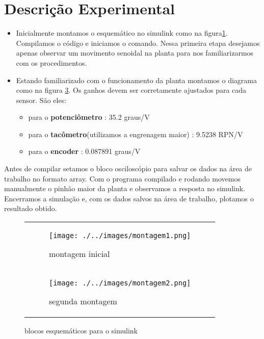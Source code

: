 \documentclass[a4paper,11pt]{article}
\begin{document}
\section{Descrição Experimental}
\begin{itemize}
\item Inicialmente montamos o esquemático no simulink como na figura\ref{fig:montagem1}. Compilamos
o código e iniciamos o comando. Nessa primeira etapa desejamos apenas observar um movimento 
senoidal na planta para nos familiarizarmos com os procedimentos.

\item Estando familiarizado com o funcionamento da planta montamos o diagrama como na figura
\ref{fig:montagem2}. Os ganhos devem ser corretamente ajustados para cada sensor. São eles:
	\begin{itemize}
		\item para o \textbf{potenciômetro} : 35.2 graus/V
		\item para o \textbf{tacômetro}(utilizamos a engrenagem maior) : 9.5238 RPN/V
		\item para o \textbf{encoder }: 0.087891 graus/V
	\end{itemize}
\end{itemize}
Antes de compilar setamos o bloco osciloscópio para salvar os dados na área de trabalho no formato
array. Com o programa compilado e rodando movemos manualmente o pinhão maior da planta e 
observamos a resposta no simulink. Encerramos a simulação e, com os dados salvos na área de 
trabalho, plotamos o resultado obtido.
\FloatBarrier
\begin{figure}[!htp]
\centering
	\begin{tabular}{l}
		\begin{subfigure}[!htp]{0.5\textwidth}
			\centering
			\texttt{[image: ./../images/montagem1.png]}
			\caption{montagem inicial}
			\label{fig:montagem1}
		\end{subfigure}		\\
		\begin{subfigure}[!htp]{0.5\textwidth}
			\centering
			\texttt{[image: ./../images/montagem2.png]}
			\caption{segunda montagem}
			\label{fig:montagem2}
		\end{subfigure}
	\end{tabular}
\caption{blocos esquemáticos para o simulink}
\end{figure}
\FloatBarrier

\end{document}
